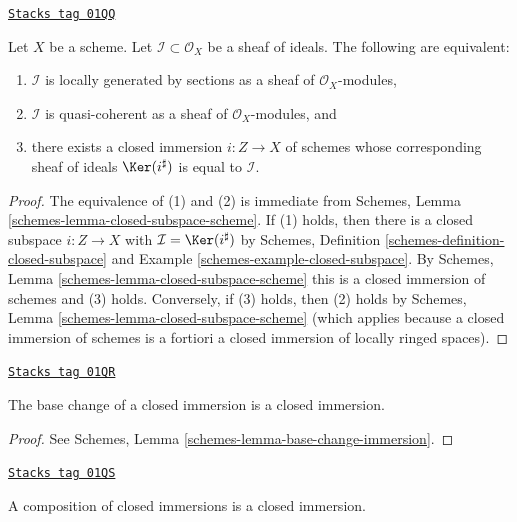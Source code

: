 \begin{lemma}
\label{morphisms-lemma-closed-immersion-bijection-ideals}
\href{https://stacks.math.columbia.edu/tag/01QQ}{\texttt{Stacks tag 01QQ}}

Let $X$ be a scheme.
Let $\mathcal{I} \subset \mathcal{O}_X$ be a sheaf of ideals.
The following are equivalent:
\begin{enumerate}
\item $\mathcal{I}$ is locally generated by
sections as a sheaf of $\mathcal{O}_X$-modules,
\item $\mathcal{I}$ is quasi-coherent as
a sheaf of $\mathcal{O}_X$-modules, and
\item there exists a closed immersion $i : Z \to X$ of schemes whose
corresponding sheaf of ideals $\Ker(i^\sharp)$ is equal to $\mathcal{I}$.
\end{enumerate}
\end{lemma}

\begin{proof}
The equivalence of (1) and (2) is immediate from
Schemes, Lemma \ref{schemes-lemma-closed-subspace-scheme}.
If (1) holds, then there is a closed subspace $i : Z \to X$
with $\mathcal{I} = \Ker(i^\sharp)$ by
Schemes, Definition \ref{schemes-definition-closed-subspace}
and Example \ref{schemes-example-closed-subspace}.
By Schemes, Lemma \ref{schemes-lemma-closed-subspace-scheme}
this is a closed immersion of schemes and (3) holds.
Conversely, if (3) holds, then (2) holds by
Schemes, Lemma \ref{schemes-lemma-closed-subspace-scheme}
(which applies because a closed immersion of schemes is a fortiori a
closed immersion of locally ringed spaces).
\end{proof}

\begin{lemma}
\label{morphisms-lemma-base-change-closed-immersion}
\href{https://stacks.math.columbia.edu/tag/01QR}{\texttt{Stacks tag 01QR}}

The base change of a closed immersion is a closed immersion.
\end{lemma}

\begin{proof}
See Schemes, Lemma \ref{schemes-lemma-base-change-immersion}.
\end{proof}

\begin{lemma}
\label{morphisms-lemma-composition-closed-immersion}
\href{https://stacks.math.columbia.edu/tag/01QS}{\texttt{Stacks tag 01QS}}

A composition of closed immersions is a closed immersion.
\end{lemma}

